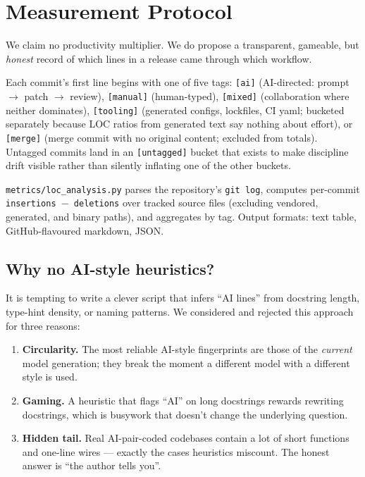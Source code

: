 \documentclass[conference]{IEEEtran}
\begin{document}
\section{Measurement Protocol}
\label{sec:method}

We claim no productivity multiplier. We do propose a transparent,
gameable, but \emph{honest} record of which lines in a release came
through which workflow.

Each commit's first line begins with one of five tags:
\texttt{[ai]} (AI-directed: prompt $\rightarrow$ patch $\rightarrow$
review),
\texttt{[manual]} (human-typed),
\texttt{[mixed]} (collaboration where neither dominates),
\texttt{[tooling]} (generated configs, lockfiles, CI yaml; bucketed
separately because LOC ratios from generated text say nothing about
effort), or
\texttt{[merge]} (merge commit with no original content; excluded
from totals). Untagged commits land in an \texttt{[untagged]} bucket
that exists to make discipline drift visible rather than silently
inflating one of the other buckets.

\texttt{metrics/loc\_analysis.py} parses the repository's
\texttt{git log}, computes per-commit \texttt{insertions $-$ deletions}
over tracked source files (excluding vendored, generated, and binary
paths), and aggregates by tag. Output formats: text table,
GitHub-flavoured markdown, JSON.

\subsection{Why no AI-style heuristics?}

It is tempting to write a clever script that infers ``AI lines'' from
docstring length, type-hint density, or naming patterns. We
considered and rejected this approach for three reasons:

\begin{enumerate}
\item \textbf{Circularity.} The most reliable AI-style fingerprints
are those of the \emph{current} model generation; they break the
moment a different model with a different style is used.
\item \textbf{Gaming.} A heuristic that flags ``AI'' on long
docstrings rewards rewriting docstrings, which is busywork that
doesn't change the underlying question.
\item \textbf{Hidden tail.} Real AI-pair-coded codebases contain a
lot of short functions and one-line wires --- exactly the cases
heuristics miscount. The honest answer is ``the author tells you''.
\end{enumerate}
\end{document}
